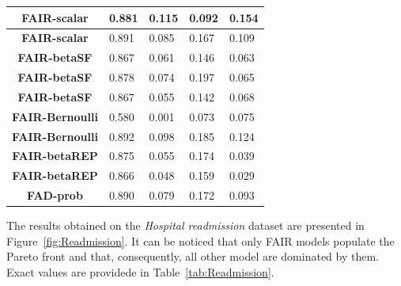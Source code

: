 \documentclass[preprint,12pt]{elsarticle}
\begin{document}
\begin{table}
\begin{tabular}{|c|l|l|l|l|}
		\textbf{FAIR-scalar}    & 0.881                             & 0.115                             & 0.092                             & 0.154                              \\ \hline
		\textbf{FAIR-scalar}    & 0.891                             & 0.085                             & 0.167                             & 0.109                              \\ \hline
		\textbf{FAIR-betaSF}    & 0.867                             & 0.061                             & 0.146                             & 0.063                              \\ \hline
		\textbf{FAIR-betaSF}    & 0.878                             & 0.074                             & 0.197                             & 0.065                              \\ \hline
		\textbf{FAIR-betaSF}    & 0.867                             & 0.055                             & 0.142                             & 0.068                              \\ \hline
		\textbf{FAIR-Bernoulli} & 0.580                             & 0.001                             & 0.073                             & 0.075                              \\ \hline
		\textbf{FAIR-Bernoulli} & 0.892                             & 0.098                             & 0.185                             & 0.124                              \\ \hline
		\textbf{FAIR-betaREP}   & 0.875                             & 0.055                             & 0.174                             & 0.039                              \\ \hline
		\textbf{FAIR-betaREP}   & 0.866                             & 0.048                             & 0.159                             & 0.029                              \\ \hline
		\textbf{FAD-prob}       & 0.890                             & 0.079                             & 0.172                             & 0.093                              \\ \hline
	\end{tabular}
	\label{tab:Adult}
\end{table}

The results obtained on the \textit{Hospital readmission} dataset are presented in Figure~\ref{fig:Readmission}. It can be noticed that only FAIR models populate the Pareto front and that, consequently, all other model are dominated by them.
Exact values are providede in Table~\ref{tab:Readmission}.
\end{document}
